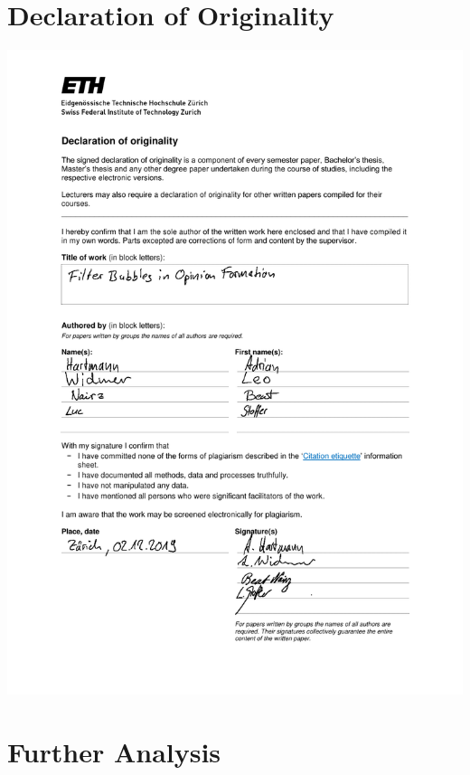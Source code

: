 \documentclass[11pt]{article}
\begin{document}
\section{Declaration of Originality}
\begin{center}
\includegraphics[scale = 0.8]{doc/latex/declaration-originality.pdf}
\end{center}

%

\section{Further Analysis}
\end{document}
